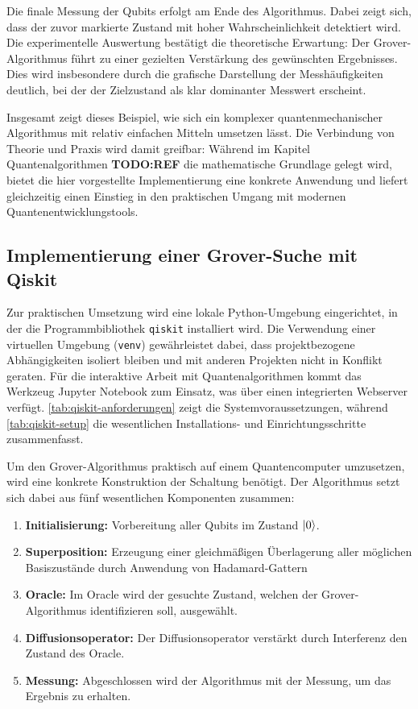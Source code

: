 Die finale Messung der Qubits erfolgt am Ende des Algorithmus. Dabei zeigt sich, dass der zuvor markierte Zustand mit hoher Wahrscheinlichkeit detektiert wird. Die experimentelle Auswertung bestätigt die theoretische Erwartung: Der Grover-Algorithmus führt zu einer gezielten Verstärkung des gewünschten Ergebnisses. Dies wird insbesondere durch die grafische Darstellung der Messhäufigkeiten deutlich, bei der der Zielzustand als klar dominanter Messwert erscheint.

Insgesamt zeigt dieses Beispiel, wie sich ein komplexer quantenmechanischer Algorithmus mit relativ einfachen Mitteln umsetzen lässt. Die Verbindung von Theorie und Praxis wird damit greifbar: Während im Kapitel Quantenalgorithmen \textbf{TODO:REF} die mathematische Grundlage gelegt wird, bietet die hier vorgestellte Implementierung eine konkrete Anwendung und liefert gleichzeitig einen Einstieg in den praktischen Umgang mit modernen Quantenentwicklungstools.

\subsection{Implementierung einer Grover-Suche mit Qiskit}
\label{sec:grover-implementation}

Zur praktischen Umsetzung wird eine lokale Python-Umgebung eingerichtet, in der die Programmbibliothek \texttt{qiskit} installiert wird. Die Verwendung einer virtuellen Umgebung (\texttt{venv}) gewährleistet dabei, dass projektbezogene Abhängigkeiten isoliert bleiben und mit anderen Projekten nicht in Konflikt geraten. Für die interaktive Arbeit mit Quantenalgorithmen kommt das Werkzeug Jupyter Notebook zum Einsatz, was über einen integrierten Webserver verfügt. \autoref{tab:qiskit-anforderungen} zeigt die Systemvoraussetzungen, während \autoref{tab:qiskit-setup} die wesentlichen Installations- und Einrichtungsschritte zusammenfasst.

Um den Grover-Algorithmus praktisch auf einem Quantencomputer umzusetzen, wird eine konkrete Konstruktion der Schaltung benötigt. Der Algorithmus setzt sich dabei aus fünf wesentlichen Komponenten zusammen: 
\begin{enumerate}
    \item  \textbf{Initialisierung:} Vorbereitung aller Qubits im Zustand $\ket{0}$.
    \item \textbf{Superposition:} Erzeugung einer gleichmäßigen Überlagerung aller möglichen Basiszustände durch Anwendung von Hadamard-Gattern
    \item \textbf{Oracle:} Im Oracle wird der gesuchte Zustand, welchen der Grover-Algorithmus identifizieren soll, ausgewählt.
    \item \textbf{Diffusionsoperator:} Der Diffusionsoperator verstärkt durch Interferenz den Zustand des Oracle.
    \item   \textbf{Messung:} Abgeschlossen wird der Algorithmus mit der Messung, um das Ergebnis zu erhalten. 
\end{enumerate}

